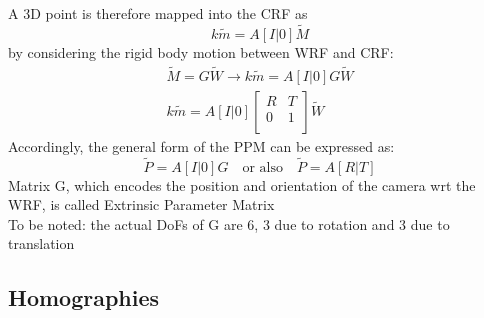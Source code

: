 \documentclass{article}
\begin{document}
A 3D point is therefore mapped into the CRF as
\begin{equation}
    k\tilde{m}=A[I|0]\tilde{M}
\end{equation}
by considering the rigid body motion between WRF and CRF:
\begin{gather}
    \tilde{M} = G \tilde{W} \rightarrow k\tilde{m}=A[I|0]G\tilde{W}\\
    k\tilde{m}=A[I|0]\begin{bmatrix}
        R & T \\
        0 & 1 \\
    \end{bmatrix} \tilde{W}
\end{gather}
Accordingly, the general form of the PPM can be expressed as:
\begin{equation}
    \tilde{P} = A[I|0]G \quad \text{or also} \quad \tilde{P}=A[R|T]
\end{equation}
Matrix G, which encodes the position and orientation of the camera wrt the WRF, is called Extrinsic Parameter Matrix\\
To be noted: the actual DoFs of G are 6, 3 due to rotation and 3 due to translation

\subsection{Homographies}
\end{document}
